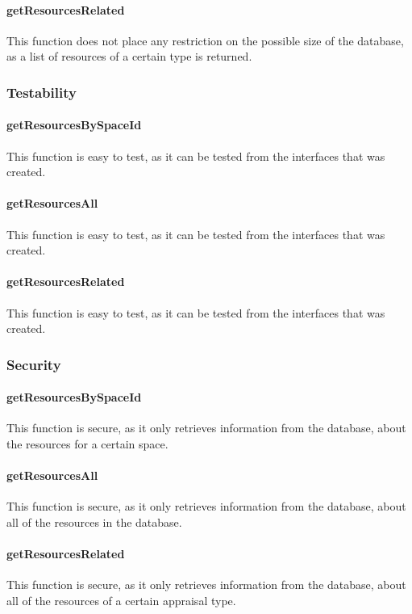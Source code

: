 \documentclass[a4paper]{article}
\begin{document}
\paragraph{getResourcesRelated}
This function does not place any restriction on the possible size of the database, as a list of resources of a certain type is returned.

\subsubsection {Testability}

\paragraph{getResourcesBySpaceId}
This function is easy to test, as it can be tested from the interfaces that was created.

\paragraph{getResourcesAll}
This function is easy to test, as it can be tested from the interfaces that was created.

\paragraph{getResourcesRelated}
This function is easy to test, as it can be tested from the interfaces that was created.

\subsubsection {Security}

\paragraph{getResourcesBySpaceId}
This function is secure, as it only retrieves information from the database, about the resources for a certain space.

\paragraph{getResourcesAll}
This function is secure, as it only retrieves information from the database, about all of the resources in the database.

\paragraph{getResourcesRelated}
This function is secure, as it only retrieves information from the database, about all of the resources of a certain appraisal type.
\end{document}
